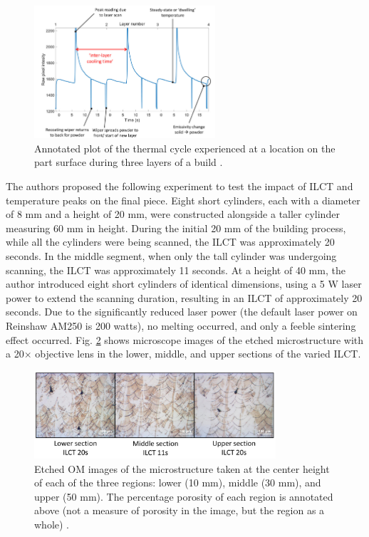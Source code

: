 \begin{figure}
    \centering
    \includegraphics[width=0.6\textwidth]{Images/temperature profile.png}
    \caption[Temperature profile.]{Annotated plot of the thermal cycle experienced at a location on the part surface during three layers of a build \cite{williams_situ_2019}.}
    \label{fig:temperatureprofile}
\end{figure}
The authors proposed the following experiment to test the impact of ILCT and temperature peaks on the final piece. Eight short cylinders, each with a diameter of 8 mm and a height of 20 mm, were constructed alongside a taller cylinder measuring 60 mm in height. During the initial 20 mm of the building process, while all the cylinders were being scanned, the ILCT was approximately 20 seconds. In the middle segment, when only the tall cylinder was undergoing scanning, the ILCT was approximately 11 seconds. At a height of 40 mm, the author introduced eight short cylinders of identical dimensions, using a 5 W laser power to extend the scanning duration, resulting in an ILCT of approximately 20 seconds. Due to the significantly reduced laser power (the default laser power on Reinshaw AM250 is 200 watts), no melting occurred, and only a feeble sintering effect occurred. Fig. \ref{fig:williamporosities} shows microscope images of the etched microstructure with a 20$\times$ objective lens in the lower, middle, and upper sections of the varied ILCT.
\begin{figure}
    \centering
    \includegraphics[width=0.8\textwidth]{Images/differntisezioni.png}
    \caption[Microstructure of reference cylinder.]{Etched OM images of the microstructure taken at the center height of each of the three regions: lower (10 mm), middle (30 mm), and upper (50 mm). The percentage porosity of each region is annotated above (not a measure of porosity in the image, but the region as a whole) \cite{williams_situ_2019}.}
    \label{fig:williamporosities}
\end{figure}
